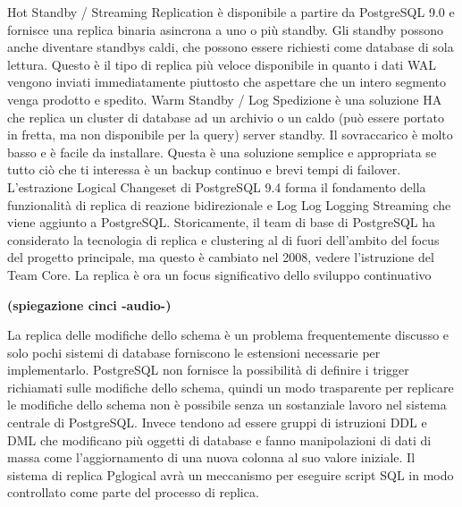 Hot Standby / Streaming Replication è disponibile a partire da PostgreSQL 9.0 e fornisce una replica binaria asincrona a uno o più standby. Gli standby possono anche diventare standbys caldi, che possono essere richiesti come database di sola lettura. Questo è il tipo di replica più veloce disponibile in quanto i dati WAL vengono inviati immediatamente piuttosto che aspettare che un intero segmento venga prodotto e spedito.
Warm Standby / Log Spedizione è una soluzione HA che replica un cluster di database ad un archivio o un caldo (può essere portato in fretta, ma non disponibile per la query) server standby. Il sovraccarico è molto basso e è facile da installare. Questa è una soluzione semplice e appropriata se tutto ciò che ti interessa è un backup continuo e brevi tempi di failover.
L'estrazione Logical Changeset di PostgreSQL 9.4 forma il fondamento della funzionalità di replica di reazione bidirezionale e Log Log Logging Streaming che viene aggiunto a PostgreSQL.
Storicamente, il team di base di PostgreSQL ha considerato la tecnologia di replica e clustering al di fuori dell'ambito del focus del progetto principale, ma questo è cambiato nel 2008, vedere l'istruzione del Team Core. La replica è ora un focus significativo dello sviluppo continuativo

\textbf{(spiegazione cinci -audio-)}


La replica delle modifiche dello schema \`{e} un problema frequentemente discusso e solo pochi sistemi di database forniscono le estensioni necessarie per implementarlo. PostgreSQL non fornisce la possibilit\`{a} di definire i trigger richiamati sulle modifiche dello schema, quindi un modo trasparente per replicare le modifiche dello schema non \`{e} possibile senza un sostanziale lavoro nel sistema centrale di PostgreSQL.
Invece tendono ad essere gruppi di istruzioni DDL e DML che modificano pi\`{u} oggetti di database e fanno manipolazioni di dati di massa come l'aggiornamento di una nuova colonna al suo valore iniziale.
Il sistema di replica Pglogical avr\`{a} un meccanismo per eseguire script SQL in modo controllato come parte del processo di replica.

